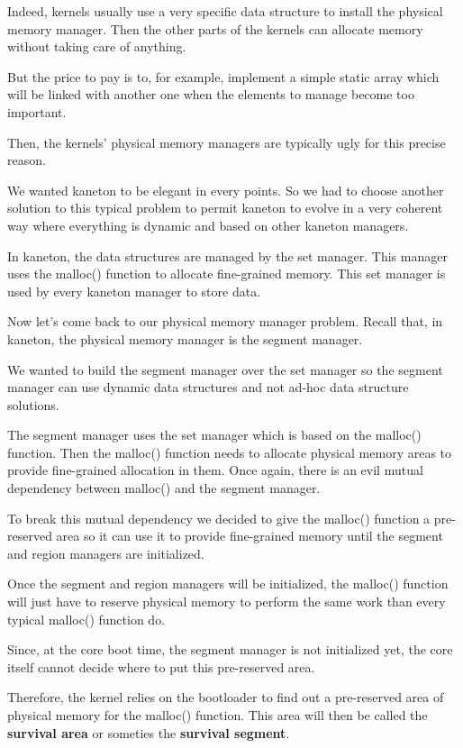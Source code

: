 Indeed, kernels usually use a very specific data structure to install
the physical memory manager. Then the other parts of the kernels can allocate
memory without taking care of anything.

But the price to pay is to, for example, implement a simple static array
which will be linked with another one when the elements to manage become
too important.

Then, the kernels' physical memory managers are typically ugly for this
precise reason.

We wanted kaneton to be elegant in every points. So we had to choose another
solution to this typical problem to permit kaneton to evolve in a very
coherent way where everything is dynamic and based on other kaneton
managers.

In kaneton, the data structures are managed by the set manager. This
manager uses the malloc() function to allocate fine-grained memory.
This set manager is used by every kaneton manager to store data.

Now let's come back to our physical memory manager problem. Recall that, in
kaneton, the physical memory manager is the segment manager.

We wanted to build the segment manager over the set manager so the segment
manager can use dynamic data structures and not ad-hoc data structure
solutions.

The segment manager uses the set manager which is based on the
malloc() function. Then the malloc() function needs to allocate
physical memory areas to provide fine-grained allocation in them. Once
again, there is an evil mutual dependency between malloc() and the segment
manager.

To break this mutual dependency we decided to give the malloc() function
a pre-reserved area so it can use it to provide fine-grained memory until
the segment and region managers are initialized.

Once the segment and region managers will be initialized, the malloc()
function will just have to reserve physical memory to perform the same
work than every typical malloc() function do.

Since, at the core boot time, the segment manager is not initialized yet,
the core itself cannot decide where to put this pre-reserved area.

Therefore, the kernel relies on the bootloader to find out a pre-reserved
area of physical memory for the malloc() function. This area will then
be called the \textbf{survival area} or someties the
\textbf{survival segment}.


